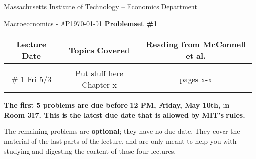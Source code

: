 \newcommand{\coursename}{Macroeconomics - AP}
\newcommand{\affiliation}{Massachusetts Institute of Technology -- Economics Department}

\begin{center}
  \small{\affiliation}

  \noindent
  \vspace{0.1em}

  \coursename \hfill \small\today
  \linebreak
  {\large\textbf{Problemset \#1}}

  \vspace{0.5em}

\end{center}
\begin{center}
  \footnotesize
  \begin{tabular}{ c c c }
    \textbf{Lecture Date} & \textbf{Topics Covered}  & \textbf{Reading from McConnell et al.} \\
    \hline                                                                                    \\
    \vspace{1em}
    \# 1 Fri 5/3          & Put stuff here Chapter x & pages x-x                              \\
    \hline
  \end{tabular}
\end{center}

\begin{center}
  \footnotesize\textbf{The first 5 problems are due before 12 PM, Friday, May 10th, in Room 317. This is the latest due date that is allowed by MIT's rules.}
\end{center}
\noindent\footnotesize
The remaining problems are \textbf{optional}; they have no due date.
They cover the material of the last parts of the lecture, and are only
meant to help you with studying and digesting the content of these four
lectures.